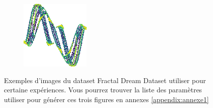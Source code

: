 \documentclass[11pt,francais]{article}
\begin{document}
\begin{figure}[!h]
\begin{subfigure}[b]{0.20\textwidth}
    \end{subfigure}
    \begin{subfigure}[b]{0.20\textwidth}
        \includegraphics[width=\textwidth]{Figures/FDD/-0,9333646250089_-0,3698044331245828_-1,9514116449042127_-0,376713271698188_-1,1759178511809651_-1,7157801385982319.png}
    \end{subfigure}
    \caption{Exemples d'images du dataset Fractal Dream Dataset utiliser pour certaine expériences. Vous pourrez trouver la liste des paramètres utiliser pour générer ces trois figures en annexes \ref{appendix:annexe1}}
    \label{fig:fig2}
\end{figure}
\end{document}
